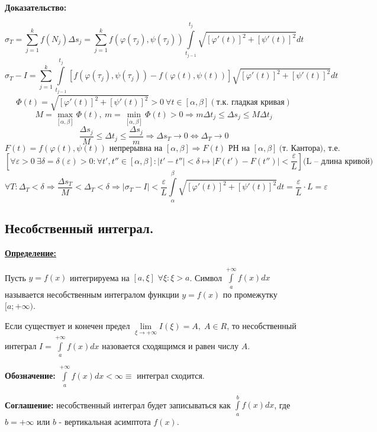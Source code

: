 \documentclass[a4paper,12pt]{article} %
\begin{document}
\textbf{Доказательство:} 

\[ \sigma_T = \sum\limits_{j=1}^{k} f(N_j) \Delta s_j = \sum\limits_{j=1}^{k} f(\varphi(\tau_j), \psi(\tau_j))  \int\limits_{t_{j-1}}^{t_j} \sqrt{\left[ \varphi'(t) \right]^2 + \left[ \psi'(t) \right]^2}dt \]
\[ \sigma_T - I = \sum\limits_{j=1}^{k} \int\limits_{t_{j-1}}^{t_j} \left[ f(\varphi(\tau_j), \psi(\tau_j)) - f(\varphi(t), \psi(t)) \right] \sqrt{\left[ \varphi'(t) \right]^2 + \left[ \psi'(t) \right]^2}dt \]
\[ \Phi (t) = \sqrt{\left[ \varphi'(t) \right]^2 + \left[ \psi'(t) \right]^2} > 0 \ \forall t \in [\alpha, \beta] (\text{т.к. гладкая кривая}) \]
\[ M = \max\limits_{[\alpha, \beta]} \Phi(t), \ m = \min\limits_{[\alpha, \beta]} \Phi(t) > 0 \Rightarrow m \Delta t_j \leqslant \Delta s_j \leqslant M \Delta t_j \]
\[ \dfrac{\Delta s_j}{M} \leqslant \Delta t_j \leqslant \dfrac{\Delta s_j}{m} \Rightarrow \Delta s_T \to 0 \Leftrightarrow \Delta_T \to 0 \]
\[F(t) = f(\varphi(t), \psi(t)) \text{ непрерывна на } [\alpha, \beta] \Rightarrow F(t) \text{ РН на } [\alpha, \beta] \ \text{(т. Кантора), т.е.} \]
\[ \left[ \forall \varepsilon > 0 \ \exists \delta = \delta (\varepsilon) > 0: \forall t', t'' \in [\alpha, \beta]: |t' - t''| < \delta \mapsto |F(t') - F(t'')| < \dfrac{\varepsilon}{L} \right] \text{(L -- длина кривой)} \]
\[ \forall T: \Delta_T < \delta \Rightarrow \dfrac{\Delta s_T}{M} < \Delta_T < \delta \Rightarrow \left| \sigma_T - I \right|< \dfrac{\varepsilon}{L} \int\limits_{\alpha}^{\beta} \sqrt{\left[ \varphi'(t) \right]^2 + \left[ \psi'(t) \right]^2} dt = \dfrac{\varepsilon}{L} \cdot L = \varepsilon \]
\subsection{Несобственный интеграл.}

\underline{\textbf{Определение:}} 

Пусть $y=f(x)$ интегрируема на $[a, \xi]$ $\forall \xi:\xi>a $. Символ $\int\limits_a^{+\infty} f(x) dx   $ называется несобственным интегралом функции $y=f(x)$ по промежутку $[a; +\infty)$.

Если существует и конечен предел $\lim\limits_{\xi \rightarrow +\infty} I(\xi) = A, \; A\in R$, то несобственный интеграл $I=\int\limits_a^{+\infty} f(x) dx$ назовается сходящимся и равен числу $A$.

\textbf{Обозначение:} $\int\limits_a^{+\infty} f(x) dx < \infty \equiv$ интеграл сходится.

\textbf{Соглашение:} несобственный интеграл будет записываться как $\int\limits_a^{b} f(x) dx$, где $b = +\infty$ или $b$ - вертикальная асимптота $f(x)$.\\
\end{document}
